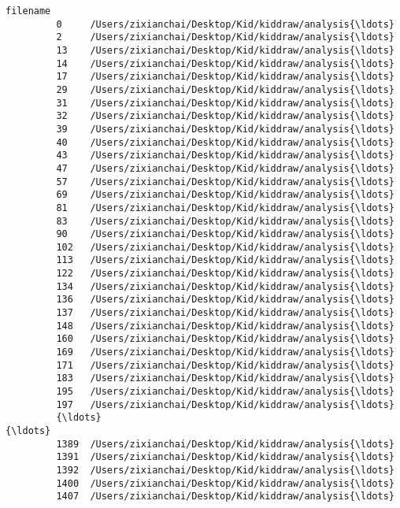 \documentclass[11pt]{article}
\begin{document}
\begin{Verbatim}[commandchars=\\\{\}]
                                                        filename  
         0     /Users/zixianchai/Desktop/Kid/kiddraw/analysis{\ldots}  
         2     /Users/zixianchai/Desktop/Kid/kiddraw/analysis{\ldots}  
         13    /Users/zixianchai/Desktop/Kid/kiddraw/analysis{\ldots}  
         14    /Users/zixianchai/Desktop/Kid/kiddraw/analysis{\ldots}  
         17    /Users/zixianchai/Desktop/Kid/kiddraw/analysis{\ldots}  
         29    /Users/zixianchai/Desktop/Kid/kiddraw/analysis{\ldots}  
         31    /Users/zixianchai/Desktop/Kid/kiddraw/analysis{\ldots}  
         32    /Users/zixianchai/Desktop/Kid/kiddraw/analysis{\ldots}  
         39    /Users/zixianchai/Desktop/Kid/kiddraw/analysis{\ldots}  
         40    /Users/zixianchai/Desktop/Kid/kiddraw/analysis{\ldots}  
         43    /Users/zixianchai/Desktop/Kid/kiddraw/analysis{\ldots}  
         47    /Users/zixianchai/Desktop/Kid/kiddraw/analysis{\ldots}  
         57    /Users/zixianchai/Desktop/Kid/kiddraw/analysis{\ldots}  
         69    /Users/zixianchai/Desktop/Kid/kiddraw/analysis{\ldots}  
         81    /Users/zixianchai/Desktop/Kid/kiddraw/analysis{\ldots}  
         83    /Users/zixianchai/Desktop/Kid/kiddraw/analysis{\ldots}  
         90    /Users/zixianchai/Desktop/Kid/kiddraw/analysis{\ldots}  
         102   /Users/zixianchai/Desktop/Kid/kiddraw/analysis{\ldots}  
         113   /Users/zixianchai/Desktop/Kid/kiddraw/analysis{\ldots}  
         122   /Users/zixianchai/Desktop/Kid/kiddraw/analysis{\ldots}  
         134   /Users/zixianchai/Desktop/Kid/kiddraw/analysis{\ldots}  
         136   /Users/zixianchai/Desktop/Kid/kiddraw/analysis{\ldots}  
         137   /Users/zixianchai/Desktop/Kid/kiddraw/analysis{\ldots}  
         148   /Users/zixianchai/Desktop/Kid/kiddraw/analysis{\ldots}  
         160   /Users/zixianchai/Desktop/Kid/kiddraw/analysis{\ldots}  
         169   /Users/zixianchai/Desktop/Kid/kiddraw/analysis{\ldots}  
         171   /Users/zixianchai/Desktop/Kid/kiddraw/analysis{\ldots}  
         183   /Users/zixianchai/Desktop/Kid/kiddraw/analysis{\ldots}  
         195   /Users/zixianchai/Desktop/Kid/kiddraw/analysis{\ldots}  
         197   /Users/zixianchai/Desktop/Kid/kiddraw/analysis{\ldots}  
         {\ldots}                                                 {\ldots}  
         1389  /Users/zixianchai/Desktop/Kid/kiddraw/analysis{\ldots}  
         1391  /Users/zixianchai/Desktop/Kid/kiddraw/analysis{\ldots}  
         1392  /Users/zixianchai/Desktop/Kid/kiddraw/analysis{\ldots}  
         1400  /Users/zixianchai/Desktop/Kid/kiddraw/analysis{\ldots}  
         1407  /Users/zixianchai/Desktop/Kid/kiddraw/analysis{\ldots}  

\end{Verbatim}
\end{document}
